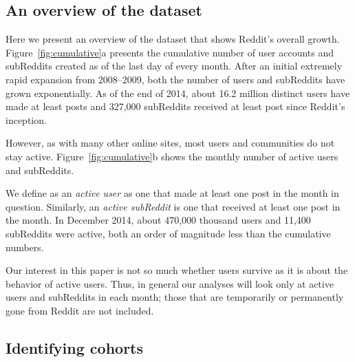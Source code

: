 \subsection{An overview of the dataset}

Here we present an overview of the dataset that shows Reddit's overall growth.  Figure~\ref{fig:cumulative}a presents the cumulative number of user accounts and subReddits created as of the last day of every month. After an initial extremely rapid expansion from 2008--2009, both the number of users and subReddits have grown exponentially.  As of the end of 2014, about 16.2 million distinct users have made at least posts and 327,000 subReddits received at least post since Reddit's inception.

However, as with many other online sites, most users \cite{} and communities \cite{butler_kraut_paper} do not stay active. Figure~\ref{fig:cumulative}b shows the monthly number of active users and subReddits.

We define as an \textit{active user} as one that made at least one post in the month in question. Similarly, an \textit{active subReddit} is one that received at least one post in the month. In December 2014, about 470,000 thousand users and 11,400 subReddits were active, both an order of magnitude less than the cumulative numbers.  

Our interest in this paper is not so much whether users survive as it is about the behavior of active users.  Thus, 
in general our analyses will look only at active users and subReddits in each month; those that are temporarily or permanently gone from Reddit are not included.  


\subsection{Identifying cohorts}

